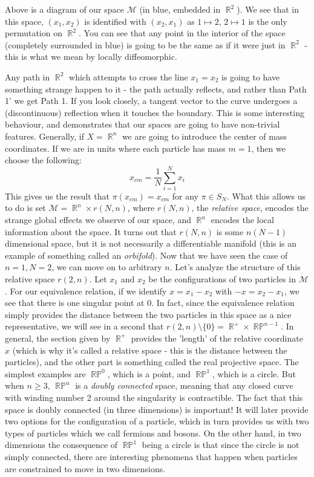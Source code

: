 \documentclass{article}
\DeclareMathOperator{\RR}{\mathbb{R}}
\DeclareMathOperator{\RP}{\mathbb{RP}}
\begin{document}
Above is a diagram of our space $\mathcal{M}$ (in blue, embedded in $\RR^2$). We see that in this space, $(x_1,x_2)$ is identified with $(x_2,x_1)$ as $1\mapsto 2$, $2\mapsto 1$ is the only permutation on $\RR^2$. You can see that any point in the interior of the space (completely surrounded in blue) is going to be the same as if it were just in $\RR^2$ - this is what we mean by locally diffeomorphic.


Any path in $\RR^2$ which attempts to cross the line $x_1=x_2$ is going to have something strange happen to it - the path actually reflects, and rather than Path 1' we get Path 1. If you look closely, a tangent vector to the curve undergoes a (discontinuous) reflection when it touches the boundary. This is some interesting behaviour, and demonstrates that our spaces are going to have non-trivial features.
Generally, if $X = \RR^n$ we are going to introduce the center of mass coordinates. If we are in units where each particle has mass $m=1$, then we choose the following:
\[x_{cm} = \frac{1}{N}\sum_{i=1}^N x_i\]
This gives us the result that $\pi(x_{cm}) = x_{cm}$ for any $\pi \in S_N$. What this allows us to do is set $\mathcal{M} = \RR^n \times r(N,n)$, where $r(N,n)$, the \textit{relative space}, encodes the strange global effects we observe of our space, and $\RR^n$ encodes the local information about the space. It turns out that $r(N,n)$ is some $n(N-1)$ dimensional space, but it is not necessarily a differentiable manifold (this is an example of something called an \textit{orbifold}). Now that we have seen the case of $n=1, N=2$, we can move on to arbitrary $n$. Let's analyze the structure of this relative space $r(2,n)$. Let $x_1$ and $x_2$ be the configurations of two particles in $\mathcal{M}$. For our equivalence relation, if we identify $x = x_1 - x_2$ with $-x = x_2 - x_1$, we see that there is one singular point at $0$. In fact, since the equivalence relation simply provides the distance between the two particles in this space as a nice representative, we will see in a second that $r(2,n) \setminus \{0\} = \RR^{+} \times {\RP}^{n-1}$. In general, the section given by $\RR^+$ provides the 'length' of the relative coordinate $x$ (which is why it's called a relative space - this is the distance between the particles), and the other part is something called the real projective space. The simplest examples are $\RP^0$, which is a point, and $\RP^1$, which is a circle. But when $n\geq 3$, $\RP^n$ is a \textit{doubly connected} space, meaning that any closed curve with winding number 2 around the singularity is contractible. The fact that this space is doubly connected (in three dimensions) is important! It will later provide two options for the configuration of a particle, which in turn provides us with two types of particles which we call fermions and bosons. On the other hand, in two dimensions the consequence of $\RP^1$ being a circle is that since the circle is not simply connected, there are interesting phenomena that happen when particles are constrained to move in two dimensions.
\end{document}
